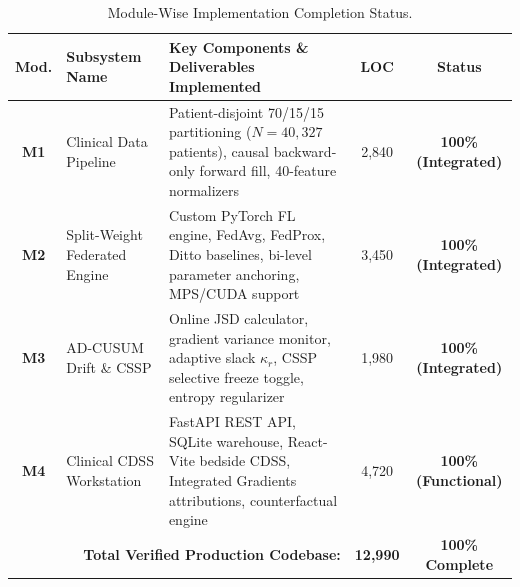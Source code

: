 \documentclass[11pt, a4paper]{article}
\begin{document}
\begin{table}[!htbp]
    \centering
    \footnotesize
    \renewcommand{\arraystretch}{1.15}
    \begin{tabular}{c l p{6.0cm} c c}
        \toprule
        \textbf{Mod.} & \textbf{Subsystem Name} & \textbf{Key Components \& Deliverables Implemented} & \textbf{LOC} & \textbf{Status} \\
        \midrule
        \textbf{M1} & Clinical Data Pipeline & Patient-disjoint 70/15/15 partitioning ($N=40,327$ patients), causal backward-only forward fill, 40-feature normalizers & 2,840 & \textbf{100\% (Integrated)} \\
        \addlinespace[2pt]
        \textbf{M2} & Split-Weight Federated Engine & Custom PyTorch FL engine, FedAvg, FedProx, Ditto baselines, bi-level parameter anchoring, MPS/CUDA support & 3,450 & \textbf{100\% (Integrated)} \\
        \addlinespace[2pt]
        \textbf{M3} & AD-CUSUM Drift \& CSSP & Online JSD calculator, gradient variance monitor, adaptive slack $\kappa_r$, CSSP selective freeze toggle, entropy regularizer & 1,980 & \textbf{100\% (Integrated)} \\
        \addlinespace[2pt]
        \textbf{M4} & Clinical CDSS Workstation & FastAPI REST API, SQLite warehouse, React-Vite bedside CDSS, Integrated Gradients attributions, counterfactual engine & 4,720 & \textbf{100\% (Functional)} \\
        \midrule
        \multicolumn{3}{r}{\textbf{Total Verified Production Codebase:}} & \textbf{12,990} & \textbf{100\% Complete} \\
        \bottomrule
    \end{tabular}
    \caption{Module-Wise Implementation Completion Status.}
    \label{tab:modules}
\end{table}
\end{document}
